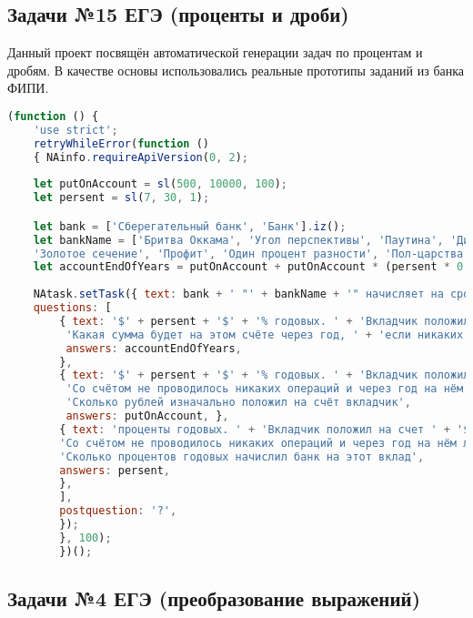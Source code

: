 \subsection{Задачи №15 ЕГЭ (проценты и дроби)}

Данный проект посвящён автоматической генерации задач по процентам и дробям. 
В качестве основы использовались реальные прототипы заданий из банка ФИПИ.

\begin{lstlisting}[language=JavaScript]
(function () { 
    'use strict'; 
    retryWhileError(function () 
    { NAinfo.requireApiVersion(0, 2); 
    
    let putOnAccount = sl(500, 10000, 100); 
    let persent = sl(7, 30, 1); 

    let bank = ['Сберегательный банк', 'Банк'].iz(); 
    let bankName = ['Бритва Оккама', 'Угол перспективы', 'Паутина', 'Динамика роста', 'Вожжи коммерции', ' Сыграй в ящик', 'Копилка', 
    'Золотое сечение', 'Профит', 'Один процент разности', 'Пол-царства', 'Падает вверх', 'Из грязи В князи'].iz(); 
    let accountEndOfYears = putOnAccount + putOnAccount * (persent * 0.01); 
    
    NAtask.setTask({ text: bank + ' "' + bankName + '" начисляет на срочный вклад ', 
    questions: [ 
        { text: '$' + persent + '$' + '% годовых. ' + 'Вкладчик положил на счет ' + '$' + putOnAccount + '$' + ' р. ' +
         'Какая сумма будет на этом счёте через год, ' + 'если никаких операций со счётом проводиться не будет', 
         answers: accountEndOfYears, 
        }, 
        { text: '$' + persent + '$' + '% годовых. ' + 'Вкладчик положил на счёт некоторую сумму. ' +
         'Со счётом не проводилось никаких операций и через год на нём лежала сумма равная ' + '$' + accountEndOfYears + '$' + ' р. ' + 
         'Сколько рублей изначально положил на счёт вкладчик', 
         answers: putOnAccount, }, 
        { text: 'проценты годовых. ' + 'Вкладчик положил на счет ' + '$' + putOnAccount + '$' + ' р. ' + 
        'Со счётом не проводилось никаких операций и через год на нём лежала сумма равная ' + '$' + accountEndOfYears + '$' + ' р. ' + 
        'Сколько процентов годовых начислил банк на этот вклад', 
        answers: persent, 
        }, 
        ], 
        postquestion: '?', 
        }); 
        }, 100); 
        })();
\end{lstlisting}

\subsection{Задачи №4 ЕГЭ (преобразование выражений)}

